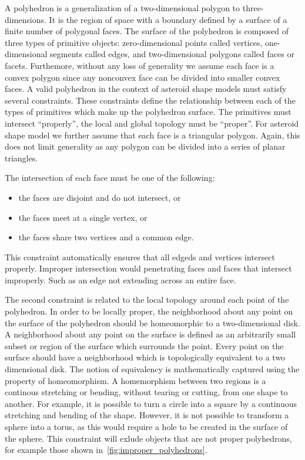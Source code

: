 A polyhedron is a generalization of a two-dimensional polygon to three-dimensions.
It is the region of space with a boundary defined by a surface of a finite number of polygonal faces.
The surface of the polyhedron is composed of three types of primitive objects: zero-dimensional points called vertices, one-dimensional segments called edges, and two-dimensional polygons called faces or facets.
Furthemore, without any loss of generality we assume each face is a convex polygon since any nonconvex face can be divided into smaller convex faces.
A valid polyhedron in the context of asteroid shape models must satisfy several constraints.
These constraints define the relationship between each of the types of primitives which make up the polyhedron surface.
The primitives must intersect ``properly'', the local and global topology must be ``proper''.
For asteroid shape model we further assume that each face is a triangular polygon. 
Again, this does not limit generality as any polygon can be divided into a series of planar triangles.

The intersection of each face must be one of the following:
\begin{itemize}
    \item the faces are disjoint and do not intersect, or
    \item the faces meet at a single vertex, or
    \item the faces share two vertices and a common edge.
\end{itemize}
This constraint automatically ensures that all edgeds and vertices intersect properly.
Improper intersection would penetrating faces and faces that intersect improperly. 
Such as an edge not extending across an entire face.

The second constraint is related to the local topology around each point of the polyhedron.
In order to be locally proper, the neighborhood about any point on the surface of the polyhedron should be homeomorphic to a two-dimensional disk.
A neighborhood about any point on the surface is defined as an arbitrarily small subset or region of the surface which surrounds the point.
Every point on the surface should have a neighborhood which is topologically equivalent to a two dimensional disk.
The notion of equivalency is mathematically captured using the property of \gls{homeomorphism}.
A homemorphism between two regions is a continous stretching or bending, without tearing or cutting, from one shape to another.
For example, it is possible to turn a circle into a square by a continuous stretching and bending of the shape.
However, it is not possible to transform a sphere into a torus, as this would require a hole to be created in the surface of the sphere.
This constraint will exlude objects that are not proper polyhedrons, for example those shown in~\cref{fig:improper_polyhedrons}.

